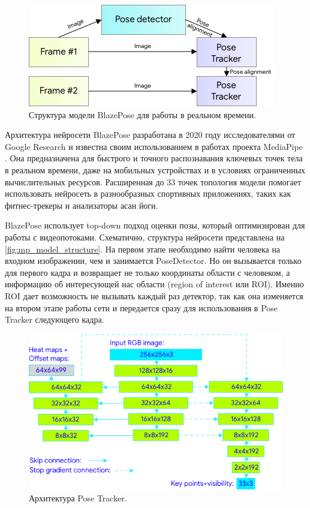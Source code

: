 \begin{figure}[b]
	\centering
	\includegraphics[width=.8\textwidth]{./images/BlazePose/Model_structure.jpg}
	\caption{Структура модели BlazePose для работы в реальном времени. \cite{BlazePose}}
	\label{fig:mp_model_structure}
\end{figure}

Архитектура нейросети BlazePose разработана в 2020 году исследователями от Google Research и известна своим использованием в работах проекта MediaPipe \cite{BlazePose, mediapipe}. Она предназначена для быстрого и точного распознавания ключевых точек тела в реальном времени, даже на мобильных устройствах и в условиях ограниченных вычислительных ресурсов. Расширенная до 33 точек топология модели помогает использовать нейросеть в разнообразных спортивных приложениях, таких как фитнес-трекеры и анализаторы асан йоги.

BlazePose использует top-down подход оценки позы, который оптимизирован для работы с видеопотоками. Схематично, структура нейросети представлена на \autoref{fig:mp_model_structure}. На первом этапе необходимо найти человека на входном изображении, чем и занимается PoseDetector. Но он вызывается только для первого кадра и возвращает не только координаты области с человеком, а информацию об интересующей нас области (region of interest или ROI). Именно ROI дает возможность не вызывать каждый раз детектор, так как она изменяется на втором этапе работы сети и передается сразу для использования в Pose Tracker следующего кадра.

\begin{figure}[h]
	\centering
	\includegraphics[width=.8\textwidth]{./images/BlazePose/architecture.jpg}
	\caption{Архитектура Pose Tracker. \cite{BlazePose}}
	\label{fig:mp_architecture}
\end{figure} 


